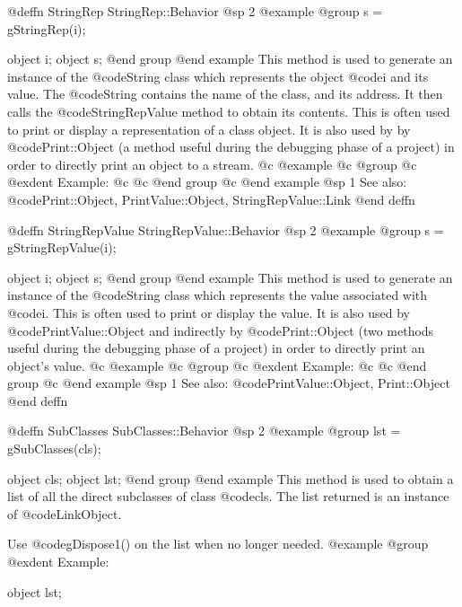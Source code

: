 @deffn {StringRep} StringRep::Behavior
@sp 2
@example
@group
s = gStringRep(i);

object  i;
object  s;
@end group
@end example
This method is used to generate an instance of the @code{String} class
which represents the object @code{i} and its value.  The @code{String}
contains the name of the class, and its address.  It then calls the
@code{StringRepValue} method to obtain its contents.  This is often used
to print or display a representation of a class object.  It is also used
by by @code{Print::Object} (a method useful during the debugging phase
of a project) in order to directly print an object to a stream.
@c @example
@c @group
@c @exdent Example:
@c 
@c @end group
@c @end example
@sp 1
See also:  @code{Print::Object, PrintValue::Object, StringRepValue::Link}
@end deffn
















@deffn {StringRepValue} StringRepValue::Behavior
@sp 2
@example
@group
s = gStringRepValue(i);

object  i;
object  s;
@end group
@end example
This method is used to generate an instance of the @code{String} class
which represents the value associated with @code{i}.  This is often
used to print or display the value.  It is also used by
@code{PrintValue::Object} and indirectly by @code{Print::Object}
(two methods useful during the debugging phase of a project)
in order to directly print an object's value.
@c @example
@c @group
@c @exdent Example:
@c 
@c @end group
@c @end example
@sp 1
See also:  @code{PrintValue::Object, Print::Object}
@end deffn










@deffn {SubClasses} SubClasses::Behavior
@sp 2
@example
@group
lst = gSubClasses(cls);

object  cls;
object  lst;
@end group
@end example
This method is used to obtain a list of all the direct subclasses of
class @code{cls}.  The list returned is an instance of
@code{LinkObject}.

Use @code{gDispose1()} on the list when no longer needed.
@example
@group
@exdent Example:

object  lst;

